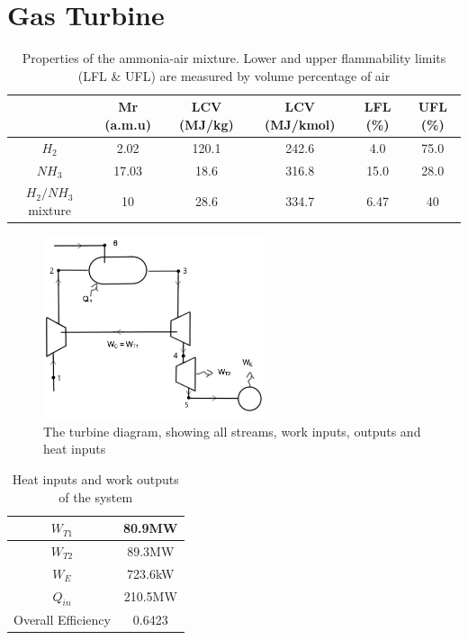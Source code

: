\documentclass[11pt, oneside]{article}
\begin{document}
\section{Gas Turbine}

\begin{table} [h]
\begin{center}
\caption{Properties of the ammonia-air mixture. Lower and upper flammability limits (LFL \& UFL) are measured by volume percentage of air \cite{FL}} \label{tab:mixproperties}
\begin{tabular}{ |c|c|c|c|c|c| }
 \hline
& Mr (a.m.u) & LCV (MJ/kg) \cite{website:spg}& LCV (MJ/kmol) & LFL (\%)& UFL (\%) \\ 
 \hline
  $H_2$ & 2.02 & 120.1 & 242.6 & 4.0 & 75.0\\ 
 \hline
$NH_3$ & 17.03 & 18.6 & 316.8 & 15.0 & 28.0\\ 
 \hline
$H_2/NH_3$ mixture & 10 & 28.6 & 334.7 & 6.47 & 40\\
 \hline
\end{tabular}
\end{center} 
\end{table}


\begin{figure} [h]
\centering
\includegraphics[width=0.58\textwidth]{./pictures/plantdiagram.png}
  \caption{The turbine diagram, showing all streams, work inputs, outputs and heat inputs} \label{fig:turbinediagram}
  \end{figure}
  
  \begin{table} [h]
\begin{center}
\caption{Heat inputs and work outputs of the system} \label{tab:powerdata}
\begin{tabular}{ |c|c| }
 \hline
  $W_{T1}$ & 80.9MW\\ 
 \hline
  $W_{T2}$ & 89.3MW\\
  \hline
  $W_E$ & 723.6kW\\
 \hline
 $Q_{in}$ & 210.5MW\\
 \hline
 Overall Efficiency & 0.6423\\ 
 \hline
\end{tabular}
\end{center}  
\end{table}
\end{document}
